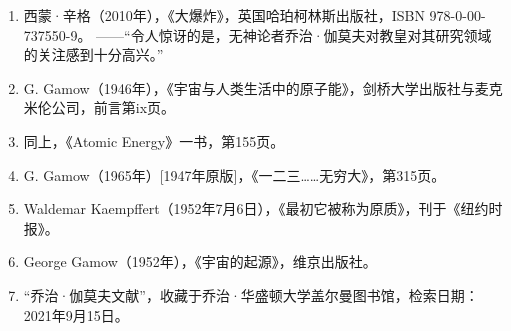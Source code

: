 \begin{enumerate}
\item 西蒙·辛格（2010年），《大爆炸》，英国哈珀柯林斯出版社，ISBN 978-0-00-737550-9。
  ——“令人惊讶的是，无神论者乔治·伽莫夫对教皇对其研究领域的关注感到十分高兴。”
\item G. Gamow（1946年），《宇宙与人类生活中的原子能》，剑桥大学出版社与麦克米伦公司，前言第ix页。
\item 同上，《Atomic Energy》一书，第155页。
\item G. Gamow（1965年）[1947年原版]，《一二三……无穷大》，第315页。
\item Waldemar Kaempffert（1952年7月6日），《最初它被称为原质》，刊于《纽约时报》。
\item George Gamow（1952年），《宇宙的起源》，维京出版社。
\item “乔治·伽莫夫文献”，收藏于乔治·华盛顿大学盖尔曼图书馆，检索日期：2021年9月15日。

\end{enumerate}
